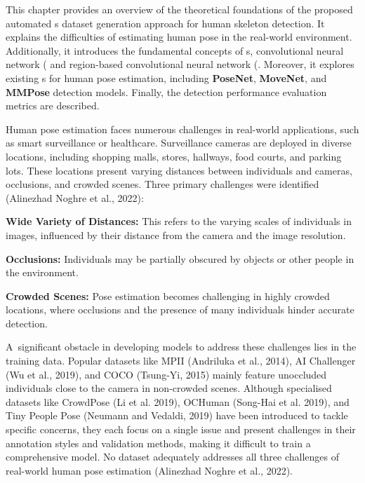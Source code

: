 This chapter provides an overview of the theoretical foundations of the proposed automated \NN\-s dataset generation approach for human skeleton detection. It explains the difficulties of estimating human pose in the real-world environment. Additionally, it introduces the fundamental concepts of \NN\-s, convolutional neural network (\CNN\) and region-based convolutional neural network (\RCNN\). Moreover, it explores existing \NN\-s for human pose estimation, including {\bf PoseNet}, {\bf MoveNet}, and {\bf MMPose} detection models. Finally, the detection performance evaluation metrics are described.

Human pose estimation faces numerous challenges in real-world applications, such as smart surveillance or healthcare. Surveillance cameras are deployed in diverse locations, including shopping malls, stores, hallways, food courts, and parking lots. These locations present varying distances between individuals and cameras, occlusions, and crowded scenes. Three primary challenges were identified (\scc Alinezhad Noghre et al., 2022):

\startitemize[n]
 \item {\bf Wide Variety of Distances:} This refers to the varying scales of individuals in images, influenced by their distance from the camera and the image resolution.
 \item {\bf Occlusions:} Individuals may be partially obscured by objects or other people in the environment.
 \item {\bf Crowded Scenes:} Pose estimation becomes challenging in highly crowded locations, where occlusions and the presence of many individuals hinder accurate detection.
\stopitemize

A~significant obstacle in developing models to address these challenges lies in the training data. Popular datasets like MPII (\scc Andriluka et al., 2014), AI Challenger (\scc Wu et al., 2019), and COCO (\scc Tsung-Yi, 2015) mainly feature unoccluded individuals close to the camera in non-crowded scenes. Although specialised datasets like CrowdPose (\scc Li et al. 2019), OCHuman (\scc Song-Hai et al. 2019), and Tiny People Pose (\scc Neumann and Vedaldi, 2019) have been introduced to tackle specific concerns, they each focus on a single issue and present challenges in their annotation styles and validation methods, making it difficult to train a comprehensive model. No dataset adequately addresses all three challenges of real-world human pose estimation (\scc Alinezhad Noghre et al., 2022).

